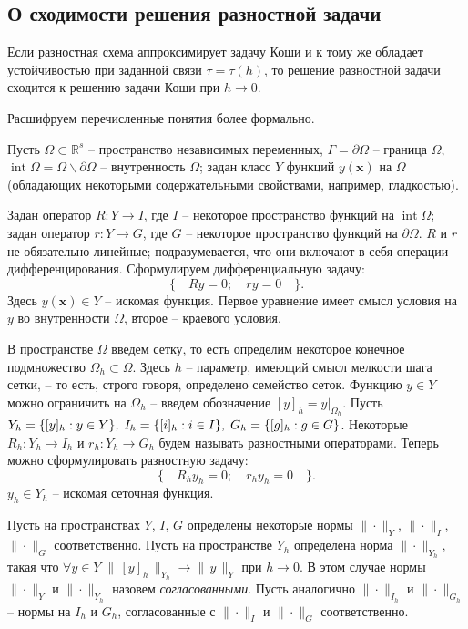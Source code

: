 \documentclass[a4paper,12pt]{article}
\DeclareMathOperator{\Int}{int}
\newcommand*{\hm}[1]{#1\nobreak\discretionary{}
{\hbox{$\mathsurround=0pt #1$}}{}}
\theoremstyle{plain}
\theoremstyle{definition}
\begin{document}
\subsection{О сходимости решения разностной задачи}

Если разностная схема аппроксимирует задачу Коши и к тому же обладает устойчивостью при заданной связи $\tau =\tau(h)$, то решение разностной задачи сходится к решению задачи Коши при $h \to 0$.

Расшифруем перечисленные понятия более формально.

Пусть $\Omega \subset \mathbb{R}^s$ -- пространство независимых переменных, $\Gamma = \partial \Omega$ -- граница $\Omega$, $\Int \Omega = \Omega \smallsetminus \partial \Omega$ -- внутренность $\Omega$; задан класс $Y$ функций $y(\mathbf{x})$ на $\Omega$ (обладающих некоторыми содержательными свойствами, например, гладкостью).

Задан оператор $R: Y \longrightarrow I$, где $I$ -- некоторое пространство функций на $\Int \Omega$; задан оператор $r: Y \longrightarrow G$, где $G$ -- некоторое пространство функций на $\partial \Omega$. $R$ и $r$ не обязательно линейные; подразумевается, что они включают в себя операции дифференцирования. Сформулируем дифференциальную задачу:
\begin{equation}
    \{ \quad Ry = 0; \quad ry = 0 \quad \} \text{.}
    \label{equation_formal_differential}
\end{equation}
Здесь $y(\mathbf{x}) \in Y$ -- искомая функция. Первое уравнение имеет смысл условия на $y$ во внутренности $\Omega$, второе -- краевого условия.

В пространстве $\Omega$ введем сетку, то есть определим некоторое конечное подмножество $\Omega_h \subset \Omega$. Здесь $h$ -- параметр, имеющий смысл мелкости шага сетки, -- то есть, строго говоря, определено семейство сеток. Функцию $y \in Y$ можно ограничить на $\Omega_h$ -- введем обозначение $[y]_h = y|_{\Omega_h}$. Пусть $Y_h = \{[y]_h: y \in Y\}, \; I_h = \{[i]_h: i \in I\}, \; G_h \hm = \{[g]_h: g \in G\}$. Некоторые $R_h: Y_h \longrightarrow I_h$ и $r_h: Y_h \longrightarrow G_h$ будем называть разностными операторами. Теперь можно сформулировать разностную задачу:
\begin{equation}
    \{ \quad R_h y_h = 0; \quad r_h y_h = 0 \quad \} \text{.}
    \label{equation_formal_subtractive}
\end{equation}
$y_h \in Y_h$ -- искомая сеточная функция.

Пусть на пространствах $Y$, $I$, $G$ определены некоторые нормы $\| \cdot \|_Y$, $\| \cdot \|_I$, $\| \cdot \|_G$ соответственно. Пусть на пространстве $Y_h$ определена норма $\| \cdot \|_{Y_h}$, такая что $\forall y \in Y \; \| \, [y]_h \, \|_{Y_h} \to \| \, y \, \|_Y$ при $h \to 0$. В этом случае нормы $\| \cdot \|_Y$ и $\| \cdot \|_{Y_h}$ назовем \emph{согласованными}. Пусть аналогично $\| \cdot \|_{I_h}$ и $\| \cdot \|_{G_h}$ -- нормы на $I_h$ и $G_h$, согласованные с $\| \cdot \|_I$ и $\| \cdot \|_G$ соответственно.
\end{document}
